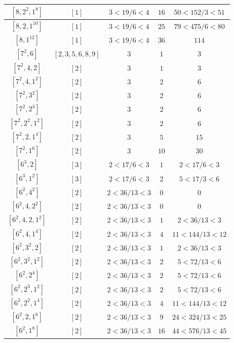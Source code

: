 \documentclass{article}%
\begin{document}
\begin{center}
\begin{longtable}{||c|c|c|c|c||}
$[8, 2^{2}, 1^{8}]$ & $[1]$ & $3 < 19/6 < 4$ & $16$ & $50 < 152/3 < 51$ \\ \hline 
$[8, 2, 1^{10}]$ & $[1]$ & $3 < 19/6 < 4$ & $25$ & $79 < 475/6 < 80$ \\ \hline 
$[8, 1^{12}]$ & $[1]$ & $3 < 19/6 < 4$ & $36$ & $114$ \\ \hline 
$[7^{2}, 6]$ & $[2, 3, 5, 6, 8, 9]$ & $3$ & $1$ & $3$ \\ \hline 
$[7^{2}, 4, 2]$ & $[2]$ & $3$ & $1$ & $3$ \\ \hline 
$[7^{2}, 4, 1^{2}]$ & $[2]$ & $3$ & $2$ & $6$ \\ \hline 
$[7^{2}, 3^{2}]$ & $[2]$ & $3$ & $2$ & $6$ \\ \hline 
$[7^{2}, 2^{3}]$ & $[2]$ & $3$ & $2$ & $6$ \\ \hline 
$[7^{2}, 2^{2}, 1^{2}]$ & $[2]$ & $3$ & $2$ & $6$ \\ \hline 
$[7^{2}, 2, 1^{4}]$ & $[2]$ & $3$ & $5$ & $15$ \\ \hline 
$[7^{2}, 1^{6}]$ & $[2]$ & $3$ & $10$ & $30$ \\ \hline 
$[6^{3}, 2]$ & $[3]$ & $2 < 17/6 < 3$ & $1$ & $2 < 17/6 < 3$ \\ \hline 
$[6^{3}, 1^{2}]$ & $[3]$ & $2 < 17/6 < 3$ & $2$ & $5 < 17/3 < 6$ \\ \hline 
$[6^{2}, 4^{2}]$ & $[2]$ & $2 < 36/13 < 3$ & $0$ & $0$ \\ \hline 
$[6^{2}, 4, 2^{2}]$ & $[2]$ & $2 < 36/13 < 3$ & $0$ & $0$ \\ \hline 
$[6^{2}, 4, 2, 1^{2}]$ & $[2]$ & $2 < 36/13 < 3$ & $1$ & $2 < 36/13 < 3$ \\ \hline 
$[6^{2}, 4, 1^{4}]$ & $[2]$ & $2 < 36/13 < 3$ & $4$ & $11 < 144/13 < 12$ \\ \hline 
$[6^{2}, 3^{2}, 2]$ & $[2]$ & $2 < 36/13 < 3$ & $1$ & $2 < 36/13 < 3$ \\ \hline 
$[6^{2}, 3^{2}, 1^{2}]$ & $[2]$ & $2 < 36/13 < 3$ & $2$ & $5 < 72/13 < 6$ \\ \hline 
$[6^{2}, 2^{4}]$ & $[2]$ & $2 < 36/13 < 3$ & $2$ & $5 < 72/13 < 6$ \\ \hline 
$[6^{2}, 2^{3}, 1^{2}]$ & $[2]$ & $2 < 36/13 < 3$ & $2$ & $5 < 72/13 < 6$ \\ \hline 
$[6^{2}, 2^{2}, 1^{4}]$ & $[2]$ & $2 < 36/13 < 3$ & $4$ & $11 < 144/13 < 12$ \\ \hline 
$[6^{2}, 2, 1^{6}]$ & $[2]$ & $2 < 36/13 < 3$ & $9$ & $24 < 324/13 < 25$ \\ \hline 
$[6^{2}, 1^{8}]$ & $[2]$ & $2 < 36/13 < 3$ & $16$ & $44 < 576/13 < 45$ \\ \hline 

\end{longtable}
\end{center}
\end{document}
